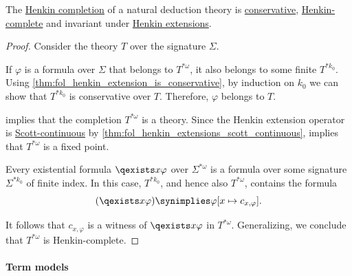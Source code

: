 \begin{proposition}\label{thm:fol_henkin_completion_is_complete}
  The \hyperref[def:fol_henkin_completion]{Henkin completion} of a natural deduction theory is \hyperref[def:fol_theory/conservative]{conservative}, \hyperref[def:fol_henkin_completeness]{Henkin-complete} and invariant under \hyperref[def:fol_henkin_extension]{Henkin extensions}.
\end{proposition}
\begin{proof}
  Consider the theory \( T \) over the signature \( \Sigma \).

   If \( \varphi \) is a formula over \( \Sigma \) that belongs to \( T^{*\omega} \), it also belongs to some finite \( T^{*k_0} \). Using \cref{thm:fol_henkin_extension_is_conservative}, by induction on \( k_0 \) we can show that \( T^{*k_0} \) is conservative over \( T \). Therefore, \( \varphi \) belongs to \( T \).

    implies that the completion \( T^{*\omega} \) is a theory. Since the Henkin extension operator is \hyperref[def:scott_continuity]{Scott-continuous} by \cref{thm:fol_henkin_extensions_scott_continuous},  implies that \( T^{*\omega} \) is a fixed point.

   Every existential formula \( \qexists x \varphi \) over \( \Sigma^{*\omega} \) is a formula over some signature \( \Sigma^{*k_0} \) of finite index. In this case, \( T^{*k_0} \), and hence also \( T^{*\omega} \), contains the formula
  \begin{equation*}
    (\qexists x \varphi) \synimplies \varphi[x \mapsto c_{x,\varphi}].
  \end{equation*}

  It follows that \( c_{x,\varphi} \) is a witness of \( \qexists x \varphi \) in \( T^{*\omega} \). Generalizing, we conclude that \( T^{*\omega} \) is Henkin-complete.
\end{proof}

\paragraph{Term models}

